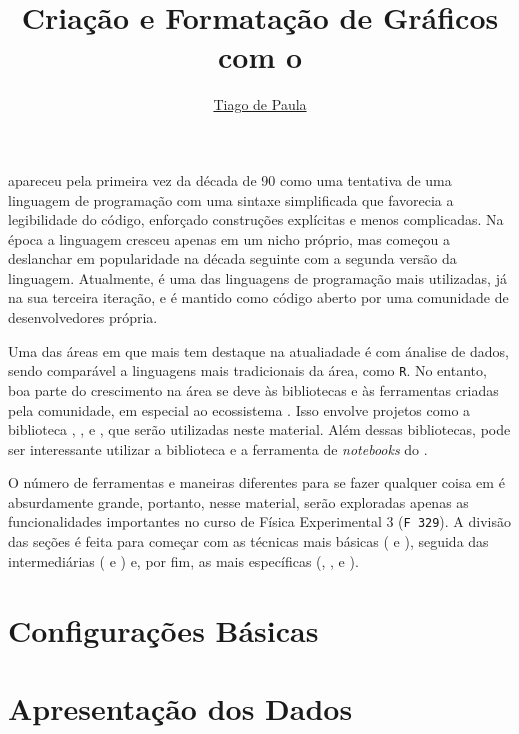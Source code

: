 \documentclass{article}
\title{Criação e Formatação de Gráficos com o}\softwarelogo
\author{\hyperref{mailto:t187679@dac.unicamp.br}{}{}{Tiago de Paula}}
\date{}
\begin{document}
    \maketitle

    \software apareceu pela primeira vez da década de 90 como uma tentativa de uma linguagem de programação com uma sintaxe simplificada que favorecia a legibilidade do código, enforçado construções explícitas e menos complicadas. Na época a linguagem cresceu apenas em um nicho próprio, mas começou a deslanchar em popularidade na década seguinte com a segunda versão da linguagem. Atualmente, \software é uma das linguagens de programação mais utilizadas, já na sua terceira iteração, e é mantido como código aberto por uma comunidade de desenvolvedores própria.

    Uma das áreas em que \software mais tem destaque na atualiadade é com ánalise de dados, sendo comparável a linguagens mais tradicionais da área, como \texttt{R}. No entanto, boa parte do crescimento na área se deve às bibliotecas e às ferramentas criadas pela comunidade, em especial ao ecossistema . Isso envolve projetos como a biblioteca , ,  e , que serão utilizadas neste material. Além dessas bibliotecas, pode ser interessante utilizar a biblioteca  e a ferramenta de \textit{notebooks} do .

    O número de ferramentas e maneiras diferentes para se fazer qualquer coisa em \software é absurdamente grande, portanto, nesse material, serão exploradas apenas as funcionalidades importantes no curso de Física Experimental 3 (\texttt{F 329}). A divisão das seções é feita para começar com as técnicas mais básicas ( e ), seguida das intermediárias ( e ) e, por fim, as mais específicas (, ,  e ).

    \section{Configurações Básicas} \label{sec:basico}
        

    \section{Apresentação dos Dados} \label{sec:reta}
        
\end{document}
